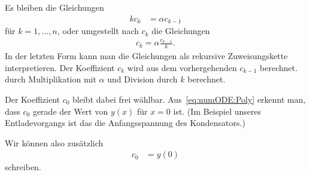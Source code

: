 \documentclass{article}
\begin{document}
Es bleiben die Gleichungen
\begin{align*}
  k c_k &= \alpha c_{k-1}
\end{align*}
für $k=1,\ldots,n$, oder umgestellt nach $c_k$ die Gleichungen
\begin{align}
  c_k = \alpha\frac{c_{k-1}}k.
  \label{eq:numODE:coeffs}
\end{align}
In der letzten Form kann man die Gleichungen als rekursive
Zuweisungskette interpretieren. Der Koeffizient $c_k$ wird aus dem
vorhergehenden $c_{k-1}$ berechnet. durch Multiplikation mit $\alpha$ und
Division durch $k$ berechnet.

Der Koeffizient $c_0$ bleibt dabei frei wählbar. Aus~\eqref{eq:numODE:Poly} erkennt man, dass $c_0$ gerade der Wert von $y(x)$ für $x=0$ ist. (Im Beispiel unseres Entladevorgangs ist das die Anfangsspannung des Kondensators.)

Wir können also zusätzlich 
\begin{align*}
  c_0 &= y(0)
\end{align*}
schreiben.
\end{document}
